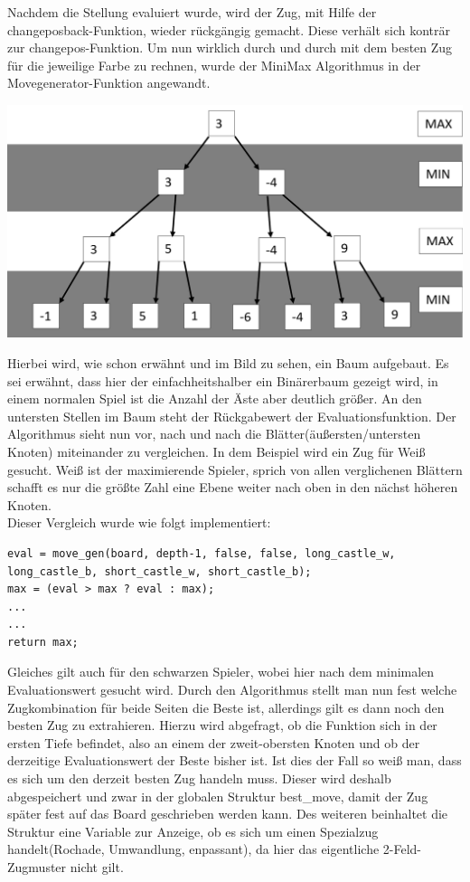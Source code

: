 \documentclass[a4paper, 12pt]{article}
\begin{document}
Nachdem die Stellung evaluiert wurde, wird der Zug, mit Hilfe der changeposback-Funktion, wieder rückgängig gemacht.
Diese verhält sich konträr zur changepos-Funktion.
Um nun wirklich durch und durch mit dem besten Zug für die jeweilige Farbe zu rechnen, wurde der MiniMax Algorithmus in der Movegenerator-Funktion angewandt.

\begin{center}
\includegraphics[scale=0.3]{images/minimax.png}
\end{center}

Hierbei wird, wie schon erwähnt und im Bild zu sehen, ein Baum aufgebaut. Es sei erwähnt, dass hier der einfachheitshalber ein Binärerbaum gezeigt wird, in einem normalen Spiel ist die Anzahl der Äste aber deutlich größer. An den untersten Stellen im Baum steht der Rückgabewert der Evaluationsfunktion. 
Der Algorithmus sieht nun vor, nach und nach die Blätter(äußersten/untersten Knoten) miteinander zu vergleichen. 
In dem Beispiel wird ein Zug für Weiß gesucht. Weiß ist der maximierende Spieler, sprich von allen verglichenen Blättern schafft es nur die größte Zahl eine Ebene weiter nach oben in den nächst höheren Knoten.\\


Dieser Vergleich wurde wie folgt implementiert:

\begin{lstlisting}
eval = move_gen(board, depth-1, false, false, long_castle_w, long_castle_b, short_castle_w, short_castle_b);
max = (eval > max ? eval : max);
...
...
return max;
\end{lstlisting}
Gleiches gilt auch für den schwarzen Spieler, wobei hier nach dem minimalen Evaluationswert gesucht wird.
Durch den Algorithmus stellt man nun fest welche Zugkombination für beide Seiten die Beste ist, allerdings gilt es dann noch den besten Zug zu extrahieren.
Hierzu wird abgefragt, ob die Funktion sich in der ersten Tiefe befindet, also an einem der zweit-obersten Knoten und ob der derzeitige Evaluationswert der Beste bisher ist.
Ist dies der Fall so weiß man, dass es sich um den derzeit besten Zug handeln muss.
Dieser wird deshalb abgespeichert und zwar in der globalen Struktur \glqq{}best\_move\grqq{}, damit der Zug später fest auf das Board geschrieben werden kann.
Des weiteren beinhaltet die Struktur eine Variable zur Anzeige, ob es sich um einen Spezialzug handelt(Rochade, Umwandlung, enpassant), da hier das eigentliche 2-Feld-Zugmuster nicht gilt.
\end{document}
